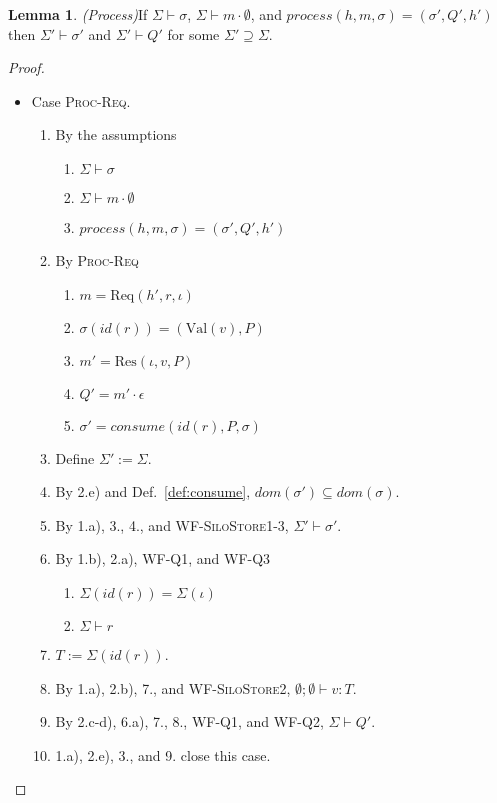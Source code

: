 \documentclass{article}
\theoremstyle{definition}
\newtheorem{lem}{Lemma}[section]
\newcommand{\Req}[3]{\text{Req}(#1, #2, #3)}
\newcommand{\ResP}[3]{\text{Res}(#1, #2, #3)}
\newcommand{\Val}[1]{\text{Val}(#1)}
\begin{document}
\begin{lem}\emph{(Process)}\label{lem:process}
If $\Sigma \vdash \sigma$, $\Sigma \vdash m \cdot \emptyset$, and $process(h, m, \sigma) = (\sigma', Q', h')$ then $\Sigma' \vdash \sigma'$ and $\Sigma' \vdash Q'$ for some $\Sigma' \supseteq \Sigma$.
\end{lem}
\begin{proof}
\begin{itemize}
\item Case \textsc{Proc-Req}.
\begin{enumerate}
\item By the assumptions
  \begin{enumerate}[label=(\alph*)]
  \item $\Sigma \vdash \sigma$
  \item $\Sigma \vdash m \cdot \emptyset$
  \item $process(h, m, \sigma) = (\sigma', Q', h')$
  \end{enumerate}
\item By \textsc{Proc-Req}
  \begin{enumerate}[label=(\alph*)]
  \item $m = {\Req {h'} r \iota}$
  \item $\sigma(id(r)) = ({\Val v}, P)$
  \item $m' = {\ResP \iota v P}$
  \item $Q' = m' \cdot \epsilon$
  \item $\sigma' = consume(id(r), P, \sigma)$
  \end{enumerate}
\item Define $\Sigma' := \Sigma$.
\item By 2.e) and Def.~\ref{def:consume}, $dom(\sigma') \subseteq dom(\sigma)$.
\item By 1.a), 3., 4., and \textsc{WF-SiloStore1-3}, $\Sigma' \vdash \sigma'$.
\item By 1.b), 2.a), \textsc{WF-Q1}, and \textsc{WF-Q3}
  \begin{enumerate}[label=(\alph*)]
  \item $\Sigma(id(r)) = \Sigma(\iota)$
  \item $\Sigma \vdash r$
  \end{enumerate}
\item $T := \Sigma(id(r))$.
\item By 1.a), 2.b), 7., and \textsc{WF-SiloStore2}, $\emptyset ; \emptyset \vdash v : T$.
\item By 2.c-d), 6.a), 7., 8., \textsc{WF-Q1}, and \textsc{WF-Q2}, $\Sigma \vdash Q'$.
\item 1.a), 2.e), 3., and 9. close this case.
\end{enumerate}


\end{itemize}
\end{proof}
\end{document}
